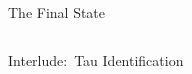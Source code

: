 \documentclass[11pt, xcolor={dvipsnames}, aspectratio=169]{beamer}
\begin{document}
\begin{frame}{The \allbold{\bbtautau} Final State}
\begin{columns}[onlytextwidth]
  \end{columns}
\end{frame}


\begin{frame}[standout]
  Interlude:\ Tau Identification
\end{frame}

\end{document}
